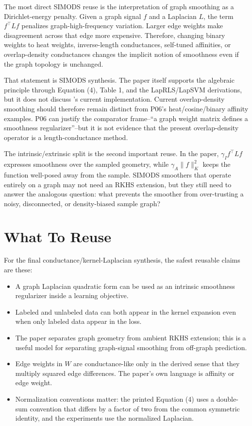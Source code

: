 \documentclass[11pt]{article}
\begin{document}
The most direct SIMODS reuse is the interpretation of graph smoothing as a
Dirichlet-energy penalty.  Given a graph signal $f$ and a Laplacian $L$, the
term $f^\top L f$ penalizes graph-high-frequency variation.  Larger edge
weights make disagreement across that edge more expensive.  Therefore,
changing binary weights to heat weights, inverse-length conductances,
self-tuned affinities, or overlap-density conductances changes the implicit
notion of smoothness even if the graph topology is unchanged.

That statement is SIMODS synthesis.  The paper itself supports the algebraic
principle through Equation (4), Table 1, and the LapRLS/LapSVM derivations,
but it does not discuss 's current implementation.  Current
 overlap-density smoothing should therefore remain distinct from
P06's heat/cosine/binary affinity examples.  P06 can justify the comparator
frame--``a graph weight matrix defines a smoothness regularizer''--but it is
not evidence that the present overlap-density operator is a length-conductance
method.

The intrinsic/extrinsic split is the second important reuse.  In the paper,
$\gamma_I f^\top Lf$ expresses smoothness over the sampled geometry, while
$\gamma_A\|f\|_K^2$ keeps the function well-posed away from the sample.
SIMODS smoothers that operate entirely on a graph may not need an RKHS
extension, but they still need to answer the analogous question: what prevents
the smoother from over-trusting a noisy, disconnected, or density-biased
sample graph?

\section{What To Reuse}

For the final conductance/kernel-Laplacian synthesis, the safest reusable
claims are these:

\begin{itemize}
  \item A graph Laplacian quadratic form can be used as an intrinsic
  smoothness regularizer inside a learning objective.
  \item Labeled and unlabeled data can both appear in the kernel expansion
  even when only labeled data appear in the loss.
  \item The paper separates graph geometry from ambient RKHS extension; this
  is a useful model for separating graph-signal smoothing from off-graph
  prediction.
  \item Edge weights in $W$ are conductance-like only in the derived sense
  that they multiply squared edge differences.  The paper's own language is
  affinity or edge weight.
  \item Normalization conventions matter: the printed Equation (4) uses a
  double-sum convention that differs by a factor of two from the common
  symmetric identity, and the experiments use the normalized Laplacian.
\end{itemize}
\end{document}
